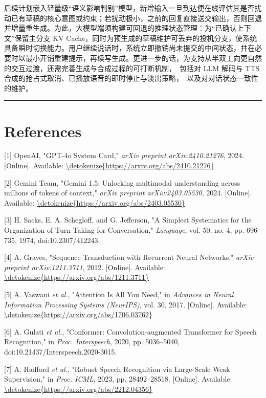 \documentclass[UTF8,a4paper,12pt]{ctexart}
\newcommand{\mdhrule}{\par\noindent\rule{\linewidth}{0.4pt}\par}
\begin{document}
后续计划嵌入轻量级“语义影响判别”模型，新增输入一旦到达便在线评估其是否扰动已有草稿的核心意图或约束；若扰动极小，之前的回复直接送交输出，否则回退并增量重生成。为此，大模型端须构建可回退的推理状态管理：为“已确认上下文”保留主分支 KV Cache，同时为预生成的草稿维护可丢弃的投机分支，使系统具备瞬时切换能力。用户继续说话时，系统立即撤销尚未提交的中间状态，并在必要时以最小开销重建提示，再续写生成。更进一步的话，为支持从半双工向更自然的交互过渡，还需完善生成与合成过程的可打断机制， 包括对 LLM 解码与 TTS 合成的抢占式取消、已播放语音的即时停止与淡出策略， 以及对对话状态一致性的维护。  

\mdhrule




\section*{References}


[1] OpenAI, "GPT-4o System Card," \textit{arXiv preprint arXiv:2410.21276}, 2024. [Online]. Available: \url{\detokenize{https://arxiv.org/abs/2410.21276}}

[2] Gemini Team, "Gemini 1.5: Unlocking multimodal understanding across millions of tokens of context," \textit{arXiv preprint arXiv:2403.05530}, 2024. [Online]. Available: \url{\detokenize{https://arxiv.org/abs/2403.05530}}

[3] H. Sacks, E. A. Schegloff, and G. Jefferson, "A Simplest Systematics for the Organization of Turn-Taking for Conversation," \textit{Language}, vol. 50, no. 4, pp. 696–735, 1974, doi:10.2307/412243.

[4] A. Graves, "Sequence Transduction with Recurrent Neural Networks," \textit{arXiv preprint arXiv:1211.3711}, 2012. [Online]. Available: \url{\detokenize{https://arxiv.org/abs/1211.3711}}

[5] A. Vaswani \textit{et al.}, "Attention Is All You Need," in \textit{Advances in Neural Information Processing Systems (NeurIPS)}, vol. 30, 2017. [Online]. Available: \url{\detokenize{https://arxiv.org/abs/1706.03762}}

[6] A. Gulati \textit{et al.}, "Conformer: Convolution-augmented Transformer for Speech Recognition," in \textit{Proc. Interspeech}, 2020, pp. 5036–5040, doi:10.21437/Interspeech.2020-3015.

[7] A. Radford \textit{et al.}, "Robust Speech Recognition via Large-Scale Weak Supervision," in \textit{Proc. ICML}, 2023, pp. 28492–28518. [Online]. Available: \url{\detokenize{https://arxiv.org/abs/2212.04356}}
\end{document}
